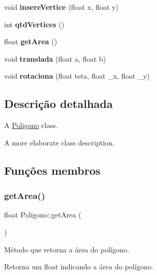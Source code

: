 \begin{DoxyCompactItemize}
\mbox{\label{classPoligono_aeaad76667207d96ea0d69c2dfb3bc2a9}} 
void {\bfseries insere\+Vertice} (float x, float y)
\item 
\mbox{\label{classPoligono_ae2c1c915b4a72104724d1302138e7caa}} 
int {\bfseries qtd\+Vertices} ()
\item 
\mbox{\label{classPoligono_ab1a85a090e7442bf3151602b05da9e19}} 
float {\bfseries get\+Area} ()
\item 
\mbox{\label{classPoligono_adbf605dfd0419b7301c9be0ec1dbe41b}} 
void {\bfseries translada} (float a, float b)
\item 
\mbox{\label{classPoligono_a93da79ac2b0cfd723c4c041f2fe1190c}} 
void {\bfseries rotaciona} (float teta, float \+\_\+x, float \+\_\+y)
\end{DoxyCompactItemize}


\subsection{Descrição detalhada}
A \mbox{\hyperlink{classPoligono}{Poligono}} class. 

A more elaborate class description. 

\subsection{Funções membros}
\mbox{\label{classPoligono_ab1a85a090e7442bf3151602b05da9e19}} 
\subsubsection{\texorpdfstring{get\+Area()}{getArea()}}
{\footnotesize\ttfamily float Poligono\+::get\+Area (\begin{DoxyParamCaption}{ }\end{DoxyParamCaption})}



Método que retorna a área do polígono. 

\begin{DoxyReturn}{Retorna}
um float indicando a área do polígono. 
\end{DoxyReturn}
\mbox{\label{classPoligono_aeaad76667207d96ea0d69c2dfb3bc2a9}} 
